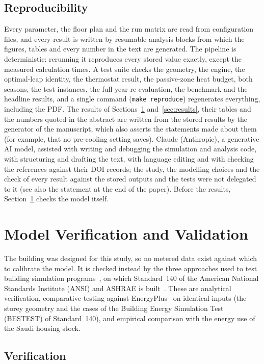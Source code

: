 \documentclass[10pt,a4paper,twocolumn]{article}
\theoremstyle{definition}
\begin{document}
\subsection{Reproducibility}\label{sec:repro}
Every parameter, the floor plan and the run matrix are read from configuration files, and every result is written by resumable analysis blocks from which the figures, tables and every number in the text are generated. The pipeline is deterministic: rerunning it reproduces every stored value exactly, except the measured calculation times. A test suite checks the geometry, the engine, the optimal-leap identity, the thermostat result, the passive-zone heat budget, both seasons, the test instances, the full-year re-evaluation, the benchmark and the headline results, and a single command (\texttt{make reproduce}) regenerates everything, including the PDF. The results of Sections~\ref{sec:vv} and~\ref{sec:results}, their tables and the numbers quoted in the abstract are written from the stored results by the generator of the manuscript, which also asserts the statements made about them (for example, that no pre-cooling setting saves). Claude (Anthropic), a generative AI model, assisted with writing and debugging the simulation and analysis code, with structuring and drafting the text, with language editing and with checking the references against their DOI records; the study, the modelling choices and the check of every result against the stored outputs and the tests were not delegated to it (see also the statement at the end of the paper). Before the results, Section~\ref{sec:vv} checks the model itself.
\section{Model Verification and Validation}\label{sec:vv}
The building was designed for this study, so no metered data exist against which to calibrate the model. It is checked instead by the three approaches used to test building simulation programs~\citep{judkoff2006validation}, on which Standard~140 of the American National Standards Institute (ANSI) and ASHRAE is built~\citep{ashrae140_2023}. These are analytical verification, comparative testing against EnergyPlus~\citep{crawley2001energyplus} on identical inputs (the storey geometry and the cases of the Building Energy Simulation Test (BESTEST) of Standard~140), and empirical comparison with the energy use of the Saudi housing stock.

\subsection{Verification}\label{sec:verification}
\end{document}
